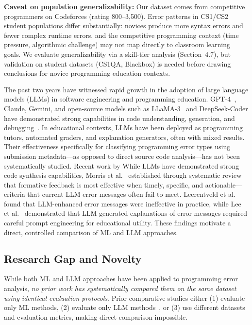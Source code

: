 \documentclass[acmsmall]{acmart}
\begin{document}
\textbf{Caveat on population generalizability:} Our dataset comes from
competitive programmers on Codeforces (rating 800--3,500). Error patterns in
CS1/CS2 student populations differ substantially: novices produce more syntax
errors and fewer complex runtime errors, and the competitive programming
context (time pressure, algorithmic challenge) may not map directly to
classroom learning goals. We evaluate generalizability via a skill-tier analysis
(Section~4.7), but validation on student datasets (CS1QA\cite{lee2022cs1qa}, Blackbox) is needed
before drawing conclusions for novice programming education contexts.

The past two years have witnessed rapid growth in the adoption of large
language models (LLMs) in software engineering and programming education.
GPT-4~\cite{openai2024gpt4}, Claude, Gemini, and open-source models such as
LLaMA-3~\cite{dubey2024llama} and DeepSeek-Coder have demonstrated strong
capabilities in code understanding, generation, and
debugging~\cite{raihan2025large,prather2024code,kazemitabaar2024impact,finnie2022robots}. In educational contexts, LLMs have been deployed as
programming tutors, automated graders, and explanation generators, often with
mixed results. Their effectiveness specifically for classifying
programming error types using submission metadata---as opposed to direct
source code analysis---has not been systematically studied. Recent work by
While LLMs have demonstrated strong code synthesis capabilities, Morris et al.~\cite{morris2021formative} established through systematic review that formative
feedback is most effective when timely, specific, and actionable---criteria that current
LLM error messages often fail to meet. Leerentveld et al.~\cite{leerentveld2024not} found that LLM-enhanced error messages were ineffective in practice,
while Lee et al.~\cite{lee2024code}
demonstrated that LLM-generated explanations of error messages required
careful prompt engineering for educational utility. These findings
motivate a direct, controlled comparison of ML and LLM approaches.

\subsection*{Research Gap and Novelty}

While both ML and LLM approaches have been applied to programming error
analysis, \textit{no prior work has systematically compared them on the same
dataset using identical evaluation protocols}. Prior comparative studies either
(1) evaluate only ML methods,
(2) evaluate only LLM methods~\cite{raihan2025large,finnie2022robots},
or (3) use different datasets and evaluation metrics, making direct comparison
impossible.
\end{document}
